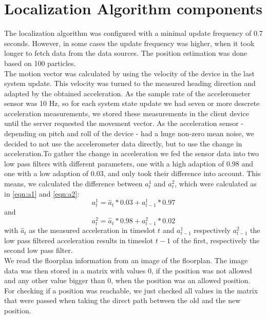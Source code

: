 \section{Localization Algorithm components}
The localization algorithm was configured with a minimal update frequency of 0.7 seconds. However, in some cases the update frequency was higher, when it took longer to fetch data from the data sources. The position estimation was done based on 100 particles.\\
\noindent\hspace*{5mm}%
The motion vector was calculated by using the velocity of the device in the last system update. This velocity was turned to the measured heading direction and adapted by the obtained acceleration.  As the sample rate of the accelerometer sensor was 10 Hz, so for each system state update we had seven or more descrete acceleration measurements, we stored these measurements in the client device until the server requested the movement vector. As the acceleration sensor - depending on pitch and roll of the device - had a huge non-zero mean noise, we decided to not use the accelerometer data directly, but to use the change in acceleration.To gather the change in acceleration we fed the sensor data into two low pass filters with different parameters, one with a high adaption of 0.98 and one with a low adaption of 0.03, and only took their difference into account. This means, we calculated the difference between $a_{t}^1$ and $a_{t}^2$, which were calculated as in \ref{eqn:a1} and \ref{eqn:a2}:
\begin{equation}
a_{t}^{1} = \hat{a}_{t}*0.03 + a_{t-1}^{1} * 0.97
\label{eqn:a1}
\end{equation}
and
\begin{equation}
a_{t}^{2} = \hat{a}_{t}*0.98 + a_{t-1}^{2} * 0.02
\label{eqn:a2}
\end{equation}
with $\hat{a}_{t}$ as the measured acceleration in timeslot $t$ and $a_{t-1}^{1}$ respectively $a_{t-1}^{2}$ the low pass filtered acceleration results in timeslot $t-1$ of the first, respectively the second low pass filter.\\
\noindent\hspace*{5mm}%
We read the floorplan information from an image of the floorplan. The image data was then stored in a matrix with values 0, if the position was not allowed and any other value bigger than 0, when the position was an allowed position. For checking if a position was reachable, we just checked all values in the matrix that were passed when taking the direct path between the old and the new position.\\
